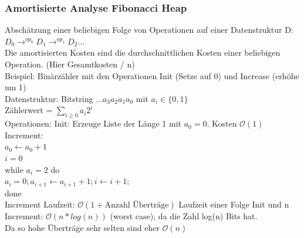 \documentclass[a4paper]{article}
\newcommand{\oh}[1]{$\mathcal{O}(#1)$}
\begin{document}
\subsubsection{Amortisierte Analyse Fibonacci Heap}
Abschätzung einer beliebigen Folge von Operationen auf einer Datenstruktur D: $D_0\rightarrow^{op_0}D_1\rightarrow^{op_1}D_2...$\\
Die amortisierten Kosten sind die durchschnittlichen Kosten einer beliebigen Operation. (Hier Gesamtkosten / n)\\
Beispiel: Binärzähler mit den Operationen Init (Setze auf 0) und Increase (erhöhe um 1)\\
Datenstruktur: Bitstring $...a_3a_2a_1a_0$ mit $ a_i\in \{0,1\}$\\
Zählerwert = $\sum_{i\geq 0}a_i2^i$\\
Operationen: Init: Erzeuge Liste der Länge 1 mit $a_0=0$. Kosten \oh{1}\\
Increment:\\
$a_0\leftarrow a_0+1$\\
$i=0$\\
while $a_i=2$ do\\
$a_i=0;a_{i+1}\leftarrow a_{i+1}+1;i\leftarrow i+1;$\\
done\\
Increment Laufzeit: \oh{1+\text{Anzahl Überträge}}
Laufzeit einer Folge Init und n Increment: \oh{n*log(n)} (worst case), da die Zahl log(n) Bits hat.\\
Da so hohe Überträge sehr selten sind eher \oh{n}
\end{document}
